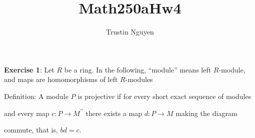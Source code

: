 \documentclass{article}
\title{Math250aHw4}
\author{Trustin Nguyen}
\begin{document}
    \maketitle

\reversemarginpar

\textbf{Exercise 1}: Let $R$ be a ring. In the following, ``module'' means left $R$-module, and maps are homomorphisms of left $R$-modules

Definition: A module $P$ is projective if for every short exact sequence of modules
    \begin{center}
    \end{center}
and every map $c : P \rightarrow M^{\prime\prime}$ there exists a map $d : P \rightarrow M$ making the diagram
    \begin{center}
    \end{center}
commute, that is, $bd = c$.
\end{document}
